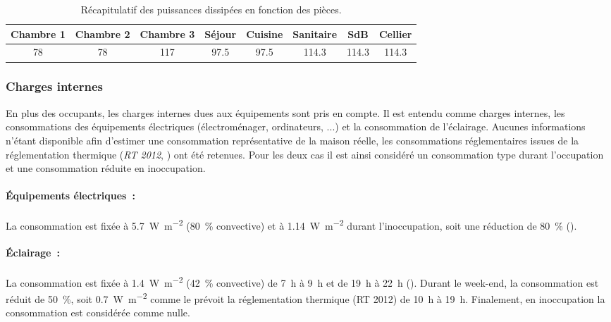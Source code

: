 
\begin{table}
\begin{tabular}{*8{c}}
    \toprule
    Chambre 1 & Chambre 2  & Chambre 3 & Séjour & Cuisine & Sanitaire & SdB   & Cellier \\
    \midrule
    \num{78}        & \num{78}         & \num{117}       & \num{97.5}   & \num{97.5}    & \num{114.3}     & \num{114.3} & \num{114.3}   \\
    \bottomrule
\end{tabular}
\caption{Récapitulatif des puissances dissipées en fonction des pièces.}
\label{tab:puissance_occupants}
\end{table}


\subsubsection{Charges internes} %
\label{ssub:charges_internes}
En plus des occupants, les charges internes dues aux équipements sont pris en compte.
Il est entendu comme charges internes, les consommations des équipements électriques
(électroménager, ordinateurs, ...) et la consommation de l’éclairage. Aucunes informations
n’étant disponible afin d’estimer une consommation représentative de la maison réelle,
les consommations réglementaires issues de la réglementation thermique (\emph{RT 2012}, \cite{CSTB2011})
ont été retenues. Pour les deux cas il est ainsi considéré un consommation type durant
l’occupation et une consommation réduite en inoccupation.

\paragraph{Équipements électriques~:} %
\label{par:equipements_electriques}
La consommation est fixée à \SI{5.7}{\watt\per m^{2}} (\SI{80}{\percent}
convective) et à \SI{1.14}{\watt\per m^{2}} durant l’inoccupation, soit une
réduction de \SI{80}{\percent} ().

\paragraph{Éclairage~:} %
\label{par:eclairage}
La consommation est fixée à \SI{1.4}{\watt\per m^{2}} (\SI{42}{\percent}
convective) de \SI{7}{\hour} à \SI{9}{\hour} et de \SI{19}{\hour} à \SI{22}{\hour}
(). Durant le week-end, la consommation est réduit de \SI{50}{\percent},
soit
\SI{0.7}{\watt\per m^{2}} comme le prévoit la réglementation thermique (RT 2012)
de \SI{10}{\hour} à \SI{19}{\hour}. Finalement, en inoccupation la consommation est
considérée comme nulle.

